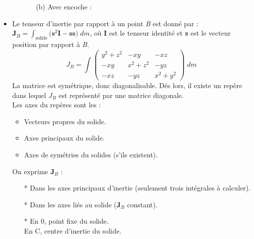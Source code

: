 \documentclass[a4paper]{article}
\begin{document}
\begin{itemize}
\begin{itemize}
\begin{enumerate}
    \item[(b)] Avec encoche : \\
    \end{enumerate}
\end{itemize}





\item Le tenseur d'inertie par rapport à un point \emph{B} est donné par : $\displaystyle \textbf{J}_B = \int_{\text{solide}} \big( \textbf{s}^2 \textbf{I} - \textbf{s} \textbf{s} \big) \; dm $, où \textbf{I} est le tenseur identité et \textbf{s} est le vecteur position par rapport à \emph{B}.
\[ J_B = \int \begin{pmatrix} y^2 + z^2 & - x y & - x z \\ - x y & x^2 + z^2 & - y z \\ - x z & - y z & x^2 + y^2 \end{pmatrix} \; d m \]
La matrice est symétrique, donc diagonalisable. Dés lors, il existe un repère dans lequel $ J_B $ est représenté par une matrice diagonale. \\
Les axes du repères sont les : 
\begin{itemize}
\item Vecteurs propres du solide.
\item Axes principaux du solide.
\item Axes de symétries du solides (s'ils existent).
\end{itemize}
On exprime $ \textbf{J}_B $ : 
\begin{itemize}
\item[*] Dans les axes principaux d'inertie (seulement trois intégrales à calculer).
\item[*] Dans les axes liés au solide ($ \textbf{J}_B $ constant).
\item[*] En 0, point fixe du solide. \\ En C, centre d'inertie du solide.
\end{itemize}


\end{itemize}
\end{document}
